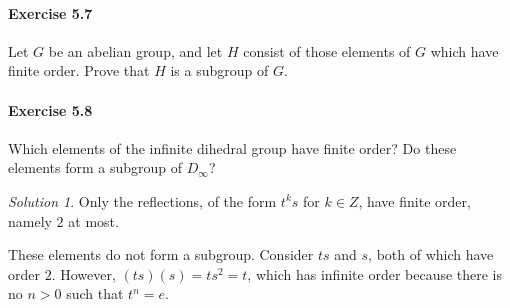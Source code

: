 \documentclass[11pt]{report}
\theoremstyle{remark}
\newtheorem*{solution}{Solution}
\begin{document}
    \paragraph{Exercise 5.7} Let $G$ be an abelian group, and let $H$ consist of
    those elements of $G$ which have finite order. Prove that $H$ is a subgroup of
    $G$.

    \paragraph{Exercise 5.8} Which elements of the infinite dihedral group have
    finite order? Do these elements form a subgroup of $D_\infty$?
    \begin{solution}
        Only the reflections, of the form $t^ks$ for $k \in Z$, have finite order,
        namely $2$ at most.

        These elements do not form a subgroup. Consider $ts$ and $s$, both of which
        have order $2$. However, $(ts)(s) = ts^2 = t$, which has infinite order
        because there is no $n > 0$ such that $t^n = e$.
    \end{solution}
    
\end{document}
